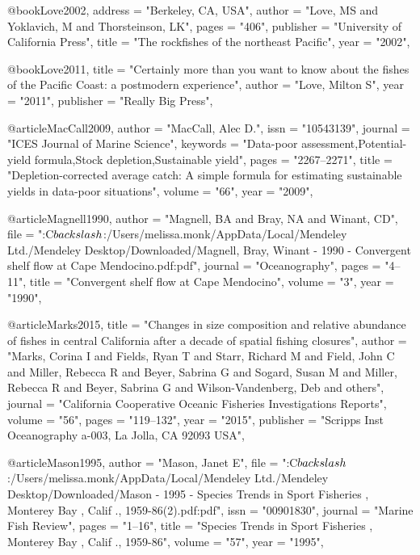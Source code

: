 @book{Love2002,
    address = "{Berkeley, CA, USA}",
    author = "{Love, MS and Yoklavich, M and Thorsteinson, LK}",
    pages = "{406}",
    publisher = "{University of California Press}",
    title = "{{The rockfishes of the northeast Pacific}}",
    year = "{2002}",
}

@book{Love2011,
    title = "{Certainly more than you want to know about the fishes of the Pacific Coast: a postmodern experience}",
    author = "{Love, Milton S}",
    year = "{2011}",
    publisher = "{Really Big Press}",
}

@article{MacCall2009,
    author = "{MacCall, Alec D.}",
    issn = "{10543139}",
    journal = "{ICES Journal of Marine Science}",
    keywords = "{Data-poor assessment,Potential-yield formula,Stock depletion,Sustainable yield}",
    pages = "{2267--2271}",
    title = "{{Depletion-corrected average catch: A simple formula for estimating sustainable yields in data-poor situations}}",
    volume = "{66}",
    year = "{2009}",
}

@article{Magnell1990,
    author = "{Magnell, BA and Bray, NA and Winant, CD}",
    file = "{:C$\\backslash$:/Users/melissa.monk/AppData/Local/Mendeley Ltd./Mendeley Desktop/Downloaded/Magnell, Bray, Winant - 1990 - Convergent shelf flow at Cape Mendocino.pdf:pdf}",
    journal = "{Oceanography}",
    pages = "{4--11}",
    title = "{{Convergent shelf flow at Cape Mendocino}}",
    volume = "{3}",
    year = "{1990}",
}

@article{Marks2015,
    title = "{Changes in size composition and relative abundance of fishes in central California after a decade of spatial fishing closures}",
    author = "{Marks, Corina I and Fields, Ryan T and Starr, Richard M and Field, John C and Miller, Rebecca R and Beyer, Sabrina G and Sogard, Susan M and Miller, Rebecca R and Beyer, Sabrina G and Wilson-Vandenberg, Deb and others}",
    journal = "{California Cooperative Oceanic Fisheries Investigations Reports}",
    volume = "{56}",
    pages = "{119--132}",
    year = "{2015}",
    publisher = "{Scripps Inst Oceanography a-003, La Jolla, CA 92093 USA}",
}

@article{Mason1995,
    author = "{Mason, Janet E}",
    file = "{:C$\\backslash$:/Users/melissa.monk/AppData/Local/Mendeley Ltd./Mendeley Desktop/Downloaded/Mason - 1995 - Species Trends in Sport Fisheries , Monterey Bay , Calif ., 1959-86(2).pdf:pdf}",
    issn = "{00901830}",
    journal = "{Marine Fish Review}",
    pages = "{1--16}",
    title = "{{Species Trends in Sport Fisheries , Monterey Bay , Calif ., 1959-86}}",
    volume = "{57}",
    year = "{1995}",
}

